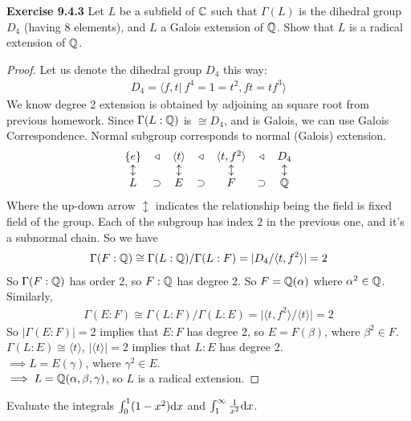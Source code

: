\documentclass{article}
\begin{document}
\begin{homeworkProblem}
    \textbf{Exercise 9.4.3} Let $L$ be a subfield of $\mathbb{C}$ such that $\Gamma(L)$ is the dihedral group $D_4$ (having 8 elements), 
    and $L$ a Galois extension of $\mathbb{Q}$. Show that $L$ is a radical extension of $\mathbb{Q}$.\\
    \begin{proof}
    Let us denote the dihedral group $D_4$ this way:
    \begin{align}
        D_4 = \langle f,t \vert \ f^4 = 1 = t^2, f t = t f^3 \rangle
    \end{align}
    We know degree 2 extension is obtained by adjoining an square root from previous homework.
    Since $\Gamma(L:\mathbb{Q})$ is $\cong D_4$, and is Galois, we can use Galois Correspondence. Normal subgroup corresponds 
    to normal (Galois) extension.
    \begin{align}
        \begin{matrix}
            \{e\} & \triangleleft & \langle t \rangle & \triangleleft & \langle t, f^2 \rangle & \triangleleft  & D_4 \\
            \updownarrow & & \updownarrow & & \updownarrow & & \updownarrow \\ 
            L & \supset & E & \supset & F & \supset & \mathbb{Q} \\
        \end{matrix}
    \end{align}
    Where the up-down arrow $\updownarrow$ indicates the relationship being the field is fixed field of the group. 
    Each of the subgroup has index $2$ in the previous one, and it's a subnormal chain. So we have
    \begin{align}
       \Gamma (F:\mathbb{Q}) \cong \Gamma (L: \mathbb{Q}) / \Gamma(L:F) = \lvert D_4 / \langle t, f^2 \rangle \rvert = 2
    \end{align}
    So $\Gamma(F:\mathbb{Q})$ has order 2, so $F:\mathbb{Q}$ has degree 2. So $F=\mathbb{Q}(\alpha)$ where $\alpha^2 \in \mathbb{Q}$.
    Similarly, 
    \begin{align}
        \Gamma(E:F) \cong \Gamma(L:F)/\Gamma(L:E) = \lvert \langle t, f^2 \rangle / \langle t \rangle \rvert = 2
    \end{align}
    So $\lvert \Gamma (E:F) \rvert = 2$ implies that $E:F$ has degree 2, so $E = F(\beta)$, where $\beta^2 \in F$.\\
    $\Gamma (L:E) \cong \langle t \rangle$, $\lvert \langle t \rangle \rvert = 2$ implies that $L:E$ has degree 2.\\
    $ \implies L = E( \gamma)$, where $\gamma^2 \in E$.\\
    $\implies L = \mathbb{Q} (\alpha, \beta, \gamma)$, so $L$ is a radical extension.

        
    \end{proof}
    


\end{homeworkProblem}

\pagebreak


\begin{homeworkProblem}[6]
    Evaluate the integrals
    \(\int_0^1 (1 - x^2) \mathrm{d}x\)
    and
    \(\int_1^{\infty} \frac{1}{x^2} \mathrm{d}x\).
\end{homeworkProblem}
\end{document}
